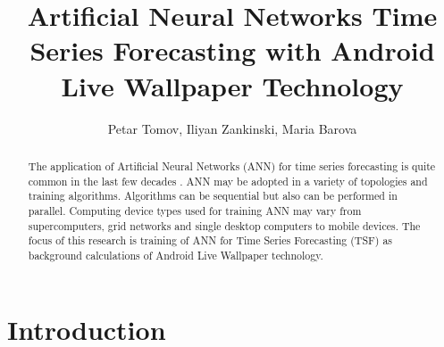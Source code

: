 \documentclass{llncs}
\begin{document}
\title{Artificial Neural Networks Time Series Forecasting with Android Live Wallpaper Technology} 

\author{Petar Tomov, Iliyan Zankinski, Maria Barova}



\maketitle


\begin{abstract}
The application of Artificial Neural Networks (ANN) for time series forecasting is quite common in the last few decades \cite{atanasova01}. ANN may be adopted in a variety of topologies and training algorithms. Algorithms can be sequential but also can be performed in parallel. Computing device types used for training ANN may vary from supercomputers, grid networks and single desktop computers to mobile devices. The focus of this research is training of ANN for Time Series Forecasting (TSF) as background calculations of Android Live Wallpaper technology. 

\end{abstract}


\section{Introduction}
\end{document}
